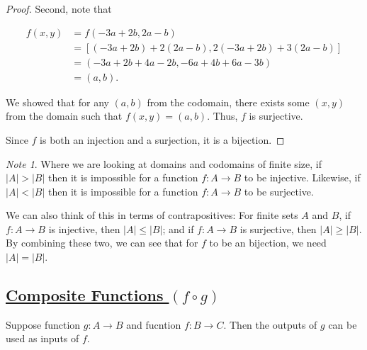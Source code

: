 \documentclass{amsart}
\theoremstyle{definition}
\theoremstyle{definition}
\theoremstyle{remark}
\newtheorem*{note}{Note}
\begin{document}
\begin{proof}
      Second, note that

      \begin{align*}
            f(x,y) &= f(-3a+2b, 2a-b) \\
            &= \left[ (-3a+2b)+2(2a-b), 2(-3a+2b)+3(2a-b) \right] \\
            &= (-3a+2b+4a-2b, -6a+4b+6a-3b) \\
            &= (a,b).
      \end{align*}

      We showed that for any $(a,b)$ from the codomain, there exists some $(x,y)$ from the domain such that $f(x,y)=(a,b)$. Thus, $f$ is surjective.


      Since $f$ is both an injection and a surjection, it is a bijection.
\end{proof}


\bigskip
\begin{note}
      Where we are looking at domains and codomains of finite size, if $|A| > |B|$ then it is impossible for a function $f:A\rightarrow B$ to be injective. Likewise, if $|A| < |B|$ then it is impossible for a function $f:A\rightarrow B$ to be surjective.


      We can also think of this in terms of contrapositives: For finite sets $A$ and $B$, if $f:A\rightarrow B$ is injective, then $|A| \leq |B|$; and if $f:A\rightarrow B$ is surjective, then $|A| \geq |B|$. By combining these two, we can see that for $f$ to be an bijection, we need $|A|=|B|$.
\end{note}









\bigskip \bigskip \bigskip

\subsection{\underline{Composite Functions $(f \circ g)$}}\hspace*{\fill}
\bigskip

Suppose function $g:A\rightarrow B$ and fucntion $f:B\rightarrow C$. Then the outputs of $g$ can be used as inputs of $f$.

\bigskip
\begin{center}
\end{center}
\bigskip
\end{document}
